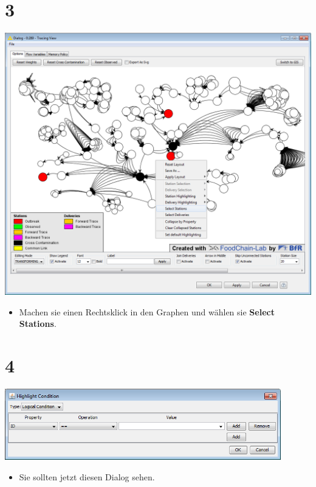 \documentclass{beamer}
\begin{document}
\section{3}
\begin{frame}
	\begin{center}
  		\includegraphics[height=0.6\textheight]{3.png}
	\end{center}
	\begin{itemize}
		\item Machen sie einen Rechtsklick in den Graphen und wählen sie \textbf{Select Stations}.
	\end{itemize}
\end{frame}

\section{4}
\begin{frame}
	\begin{center}
  		\includegraphics[width=0.9\textwidth]{4.png}
	\end{center}
	\begin{itemize}
		\item Sie sollten jetzt diesen Dialog sehen.
	\end{itemize}
\end{frame}
\end{document}
